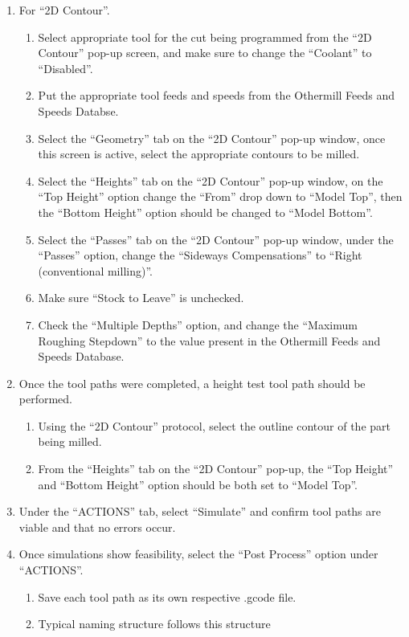 \begin{enumerate}
\begin{enumerate}
\begin{enumerate}
				\end{enumerate}
			\item For “2D Contour”.
				\begin{enumerate}
					\item Select appropriate tool for the cut being programmed from the “2D Contour” pop-up screen, and make sure to change the “Coolant” to “Disabled”.
				        \item Put the appropriate tool feeds and speeds from the Othermill Feeds and Speeds Databse.
				        \item Select the “Geometry” tab on the “2D Contour” pop-up window, once this screen is active, select the appropriate contours to be milled.
				        \item Select the “Heights” tab on the “2D Contour” pop-up window, on the “Top Height” option change the “From” drop down to “Model Top”, then the “Bottom Height” option should be changed to “Model Bottom”.
				        \item Select the “Passes” tab on the “2D Contour” pop-up window, under the “Passes” option, change the “Sideways Compensations” to “Right (conventional milling)”.
				        \item Make sure “Stock to Leave” is unchecked.
					\item Check the “Multiple Depths” option, and change the “Maximum Roughing Stepdown” to the value present in the Othermill Feeds and Speeds Database.
				\end{enumerate}
			\item Once the tool paths were completed, a height test tool path should be performed.
				\begin{enumerate}
					\item Using the “2D Contour” protocol, select the outline contour of the part being milled.
				        \item From the “Heights” tab on the “2D Contour” pop-up, the “Top Height” and “Bottom Height” option should be both set to “Model Top”.
				\end{enumerate}
			\item Under the “ACTIONS” tab, select “Simulate” and confirm tool paths are viable and that no errors occur.
			\item Once simulations show feasibility, select the “Post Process” option under “ACTIONS”.
				\begin{enumerate}
					\item Save each tool path as its own respective .gcode file.
					\item Typical naming structure follows this structure

\end{enumerate}
\end{enumerate}
\end{enumerate}
